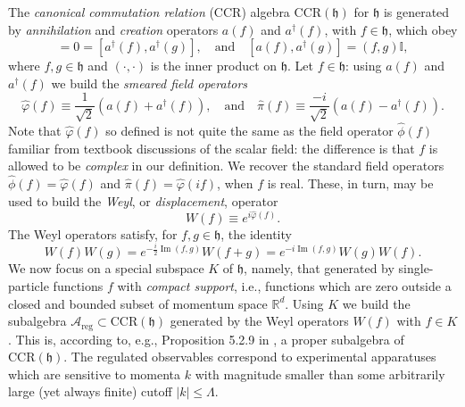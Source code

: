 \documentclass[11pt]{amsart}
\DeclareMathOperator{\im}{Im}
\theoremstyle{plain}%
\theoremstyle{definition}
\theoremstyle{remark}
\begin{document}
The \emph{canonical commutation relation} (CCR) algebra $\text{CCR}(\mathfrak{h})$ for $\mathfrak{h}$ is generated by \emph{annihilation} and \emph{creation} operators $a(f)$ and $a^\dag(f)$, with $f\in\mathfrak{h}$, which obey
\begin{equation}
	[a(f), a(g)] = 0 = [a^\dag(f), a^\dag(g)], \quad \text{and}\quad [a(f), a^\dag(g)] = (f,g)\mathbb{I},
\end{equation}
where $f, g\in \mathfrak{h}$ and $(\cdot, \cdot)$ is the inner product on $\mathfrak{h}$. Let $f\in \mathfrak{h}$: using $a(f)$ and $a^\dag(f)$ we build the \emph{smeared field operators}
\begin{equation}
	\widehat{\varphi}(f) \equiv \frac{1}{\sqrt2}(a(f) + a^\dag(f)), \quad \text{and} \quad \widehat{\pi}(f) \equiv \frac{-i}{\sqrt2}(a(f) - a^\dag(f)).
\end{equation}
Note that $\widehat{\varphi}(f)$ so defined is not quite the same as the field operator $\widehat{\phi}(f)$ familiar from textbook discussions of the scalar field: the difference is that $f$ is allowed to be \emph{complex} in our definition. We recover the standard field operators $\widehat{\phi}(f) = \widehat{\varphi}(f)$ and $\widehat{\pi}(f) = \widehat{\varphi}(if)$, when $f$ is real. These, in turn, may be used to build the \emph{Weyl}, or \emph{displacement}, operator
\begin{equation}
	W(f) \equiv e^{i\widehat{\varphi}(f)}.
\end{equation}
The Weyl operators satisfy, for $f, g \in \mathfrak{h}$, the identity
\begin{equation}
	W(f)W(g) = e^{-\frac{i}{2}\im(f,g)}W(f+g) = e^{-{i}\im(f,g)}W(g)W(f).
\end{equation}
We now focus on a special subspace $K$ of $\mathfrak{h}$, namely, that generated by single-particle functions $f$ with \emph{compact support}, i.e., functions which are zero outside a closed and bounded subset of momentum space $\mathbb{R}^d$. Using $K$ we build the subalgebra $\mathcal{A}_{\text{reg}}\subset \text{CCR}(\mathfrak{h})$ generated by the Weyl operators $W(f)$ with $f\in K$. This is, according to, e.g., Proposition 5.2.9 in \cite{bratteli_operator_1997}, a proper subalgebra of $\text{CCR}(\mathfrak{h})$. The regulated observables correspond to experimental apparatuses which are sensitive to momenta $k$ with magnitude smaller than some arbitrarily large (yet always finite) cutoff $|k| \le \Lambda$.
\end{document}
